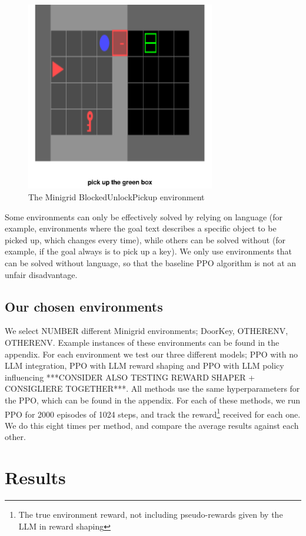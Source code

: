\documentclass[conference]{IEEEtran}
\begin{document}
\begin{figure}[h]
\centerline{\includegraphics[width=3.25in]{figure/blockedunlockpickupenv.png}}
\caption{The Minigrid BlockedUnlockPickup environment}
\label{blockedunlockpickupenv}
\end{figure}

Some environments can only be effectively solved by relying on language (for example, environments where the goal text describes a specific object to be picked up, which changes every time), while others can be solved without (for example, if the goal always is to pick up a key). We only use environments that can be solved without language, so that the baseline PPO algorithm is not at an unfair disadvantage.

\subsection{Our chosen environments}

We select NUMBER different Minigrid environments; DoorKey, OTHERENV, OTHERENV. Example instances of these environments can be found in the appendix. For each environment we test our three different models; PPO with no LLM integration, PPO with LLM reward shaping and PPO with LLM policy influencing ***CONSIDER ALSO TESTING REWARD SHAPER + CONSIGLIERE TOGETHER***. All methods use the same hyperparameters for the PPO, which can be found in the appendix. For each of these methods, we run PPO for 2000 episodes of 1024 steps, and track the reward\footnote{The true environment reward, not including pseudo-rewards given by the LLM in reward shaping} received for each one. We do this eight times per method, and compare the average results against each other.

\section{Results}
\end{document}
